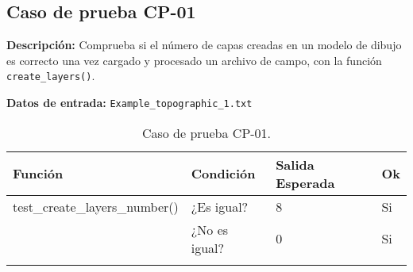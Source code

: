 \subsection{Caso de prueba CP-01}

\textbf{Descripción:} Comprueba si el número de capas creadas en un modelo de dibujo es correcto una vez cargado y procesado un archivo de campo, con la función \texttt{create\_layers()}.

\textbf{Datos de entrada:} \texttt{Example\_topographic\_1.txt}

\newpage

\begin{longtable}[]{@{}llll@{}}
\toprule
\begin{minipage}[b]{0.6\columnwidth}\raggedright\strut
Función\strut
\end{minipage} & \begin{minipage}[b]{0.20\columnwidth}\raggedright\strut
Condición\strut
\end{minipage} & \begin{minipage}[b]{0.15\columnwidth}\raggedright\strut
Salida Esperada\strut
\end{minipage} & \begin{minipage}[b]{0.05\columnwidth}\raggedright\strut
Ok\strut
\end{minipage}\tabularnewline
\midrule
\endhead
\begin{minipage}[t]{0.6\columnwidth}\raggedright\strut
test\_create\_layers\_number()\strut
\end{minipage} & \begin{minipage}[t]{0.20\columnwidth}\raggedright\strut
¿Es igual?\strut
\end{minipage} & \begin{minipage}[t]{0.15\columnwidth}\raggedright\strut
8\strut
\end{minipage} & \begin{minipage}[t]{0.05\columnwidth}\raggedright\strut
Si\strut
\end{minipage}\tabularnewline
\begin{minipage}[t]{0.6\columnwidth}\raggedright\strut
\strut
\end{minipage} & \begin{minipage}[t]{0.20\columnwidth}\raggedright\strut
¿No es igual?\strut
\end{minipage} & \begin{minipage}[t]{0.15\columnwidth}\raggedright\strut
0\strut
\end{minipage} & \begin{minipage}[t]{0.05\columnwidth}\raggedright\strut
Si\strut
\end{minipage}\tabularnewline

\bottomrule
\caption{Caso de prueba CP-01.}
\end{longtable}

